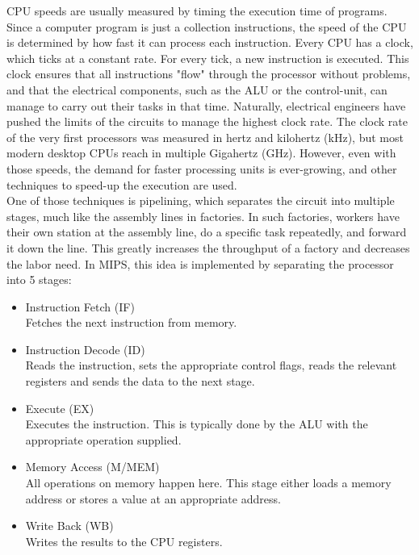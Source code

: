 CPU speeds are usually measured by timing the execution time of programs. Since
a computer program is just a collection instructions, the speed of the CPU is
determined by how fast it can process each instruction.
Every CPU has a clock, which ticks at a constant rate. For every tick, a new
instruction is executed. This clock ensures that all instructions "flow" through
the processor without problems, and that the electrical components, such as the
ALU or the control-unit, can manage to carry out their tasks in that time.
Naturally, electrical engineers have pushed the limits of the circuits to manage
the highest clock rate. The clock rate of the very first processors was measured
in hertz and kilohertz (kHz), but most modern desktop CPUs reach in multiple
Gigahertz (GHz)\cite{wiki:clock_rate}. However, even with those speeds, the
demand for faster processing units is ever-growing, and other techniques to speed-up
the execution are used.\\
One of those techniques is pipelining, which separates the circuit into multiple
stages, much like the assembly lines in factories. In such factories, workers
have their own station at the assembly line, do a specific task repeatedly, and
forward it down the line. This greatly increases the throughput of a factory and
decreases the labor need.
In MIPS, this idea is implemented by separating the processor into 5 stages\cite{COD5}:
\begin{itemize}
	\item Instruction Fetch (IF)\\
Fetches the next instruction from memory.

	\item Instruction Decode (ID)\\
Reads the instruction, sets the appropriate control flags, reads the relevant
registers and sends the data to the next stage.

	\item Execute (EX)\\
Executes the instruction. This is typically done by the ALU with the appropriate
operation supplied.

	\item Memory Access (M/MEM)\\
All operations on memory happen here. This stage either loads a memory address
or stores a value at an appropriate address.

	\item Write Back (WB)\\
Writes the results to the CPU registers.
\end{itemize}
